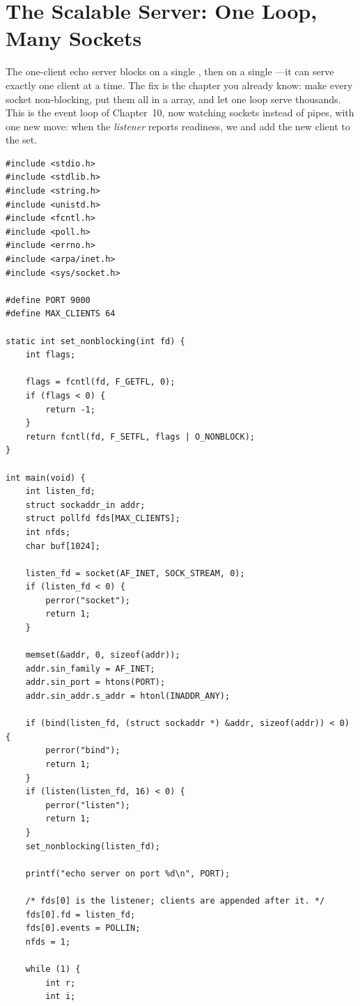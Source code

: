 \section{The Scalable Server: One Loop, Many Sockets}

The one-client echo server blocks on a single , then on a
single ---it can serve exactly one client at a time. The
fix is the chapter you already know: make every socket non-blocking,
put them all in a  array, and let one loop serve thousands.
This is the event loop of Chapter~10, now watching sockets instead of
pipes, with one new move: when the \emph{listener} reports readiness,
we  and add the new client to the set.

\begin{lstlisting}[caption={echo\_server.c: a poll-driven, multi-client echo server.}]
#include <stdio.h>
#include <stdlib.h>
#include <string.h>
#include <unistd.h>
#include <fcntl.h>
#include <poll.h>
#include <errno.h>
#include <arpa/inet.h>
#include <sys/socket.h>

#define PORT 9000
#define MAX_CLIENTS 64

static int set_nonblocking(int fd) {
    int flags;

    flags = fcntl(fd, F_GETFL, 0);
    if (flags < 0) {
        return -1;
    }
    return fcntl(fd, F_SETFL, flags | O_NONBLOCK);
}

int main(void) {
    int listen_fd;
    struct sockaddr_in addr;
    struct pollfd fds[MAX_CLIENTS];
    int nfds;
    char buf[1024];

    listen_fd = socket(AF_INET, SOCK_STREAM, 0);
    if (listen_fd < 0) {
        perror("socket");
        return 1;
    }

    memset(&addr, 0, sizeof(addr));
    addr.sin_family = AF_INET;
    addr.sin_port = htons(PORT);
    addr.sin_addr.s_addr = htonl(INADDR_ANY);

    if (bind(listen_fd, (struct sockaddr *) &addr, sizeof(addr)) < 0) {
        perror("bind");
        return 1;
    }
    if (listen(listen_fd, 16) < 0) {
        perror("listen");
        return 1;
    }
    set_nonblocking(listen_fd);

    printf("echo server on port %d\n", PORT);

    /* fds[0] is the listener; clients are appended after it. */
    fds[0].fd = listen_fd;
    fds[0].events = POLLIN;
    nfds = 1;

    while (1) {
        int r;
        int i;


\end{lstlisting}
